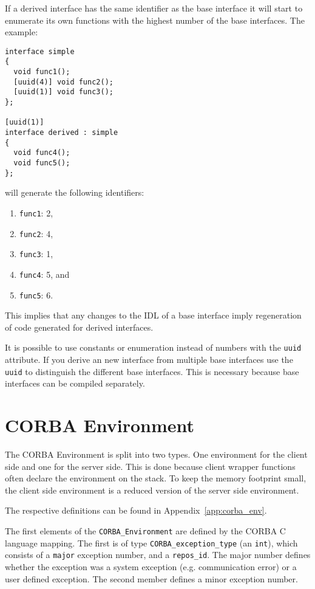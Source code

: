 If a derived interface has the same identifier as the base interface
it will start to enumerate its own functions with the highest number
of the base interfaces. The example:

\begin{verbatim}
interface simple
{
  void func1();
  [uuid(4)] void func2();
  [uuid(1)] void func3();
};

[uuid(1)]
interface derived : simple
{
  void func4();
  void func5();
};
\end{verbatim}

will generate the following identifiers:

\begin{enumerate}
\item \verb|func1|: 2,
\item \verb|func2|: 4,
\item \verb|func3|: 1,
\item \verb|func4|: 5, and
\item \verb|func5|: 6.
\end{enumerate}

This implies that any changes to the IDL of a base interface imply
regeneration of code generated for derived interfaces.

It is possible to use constants or enumeration instead of numbers with the
\verb|uuid| attribute.  If you derive an new interface from multiple base
interfaces use the \verb|uuid| to distinguish the different base interfaces.
This is necessary because base interfaces can be compiled separately.

\section{CORBA Environment}
\label{sec:environment}

The CORBA Environment is split into two types.  One environment for the client
side and one for the server side.  This is done because client wrapper
functions often declare the environment on the stack.  To keep the memory
footprint small, the client side environment is a reduced version of the
server side environment.

The respective definitions can be found in Appendix~\ref{app:corba_env}.

The first elements of the \verb|CORBA_Environment| are defined
by the CORBA C language mapping. The first is of type
\verb|CORBA_exception_type| (an \verb|int|), which consists of
a \verb|major| exception number, and a \verb|repos_id|. The major
number defines whether the exception was a system exception (e.g.
communication error) or a user defined exception. The second
member defines a minor exception number.

